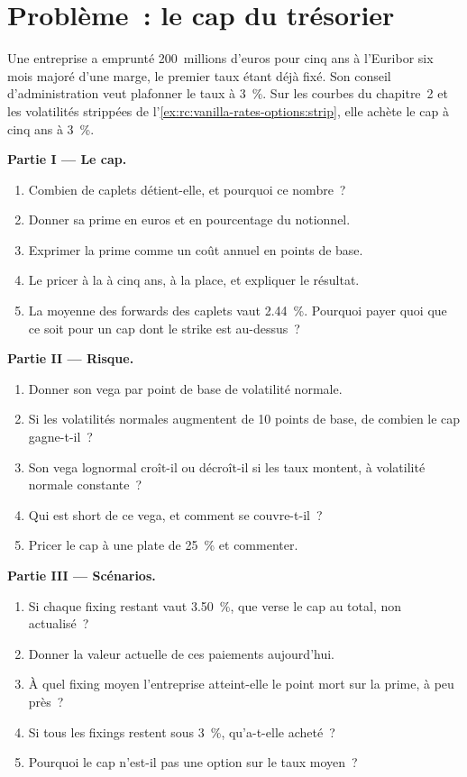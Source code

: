 \section{Problème~: le cap du trésorier}

\begin{problem}\label{pb:rc:vanilla-rates-options:1}
Une entreprise a emprunté 200~millions d'euros pour cinq ans à l'Euribor six mois
majoré d'une marge, le premier taux étant déjà fixé. Son conseil d'administration
veut plafonner le taux à 3~\%. Sur les courbes du chapitre~2 et les volatilités
strippées de l'\cref{ex:rc:vanilla-rates-options:strip}, elle achète le cap à cinq ans à 3~\%.

\medskip\noindent\textbf{Partie I --- Le cap.}
\begin{enumerate}
\item Combien de caplets détient-elle, et pourquoi ce nombre~?
\item Donner sa prime en euros et en pourcentage du notionnel.
\item Exprimer la prime comme un coût annuel en points de base.
\item Le pricer à la  à cinq ans, à la place, et expliquer le résultat.
\item La moyenne des forwards des caplets vaut 2.44~\%. Pourquoi payer quoi que ce soit
pour un cap dont le strike est au-dessus~?
\end{enumerate}

\medskip\noindent\textbf{Partie II --- Risque.}
\begin{enumerate}[resume]
\item Donner son vega par point de base de volatilité normale.
\item Si les volatilités normales augmentent de 10 points de base, de combien le cap gagne-t-il~?
\item Son vega lognormal croît-il ou décroît-il si les taux montent, à volatilité normale
constante~?
\item Qui est short de ce vega, et comment se couvre-t-il~?
\item Pricer le cap à une  plate de 25~\% et commenter.
\end{enumerate}

\medskip\noindent\textbf{Partie III --- Scénarios.}
\begin{enumerate}[resume]
\item Si chaque fixing restant vaut 3.50~\%, que verse le cap au total,
non actualisé~?
\item Donner la valeur actuelle de ces paiements aujourd'hui.
\item À quel fixing moyen l'entreprise atteint-elle le point mort sur la prime,
à peu près~?
\item Si tous les fixings restent sous 3~\%, qu'a-t-elle acheté~?
\item Pourquoi le cap n'est-il pas une option sur le taux moyen~?
\end{enumerate}


\end{problem}
